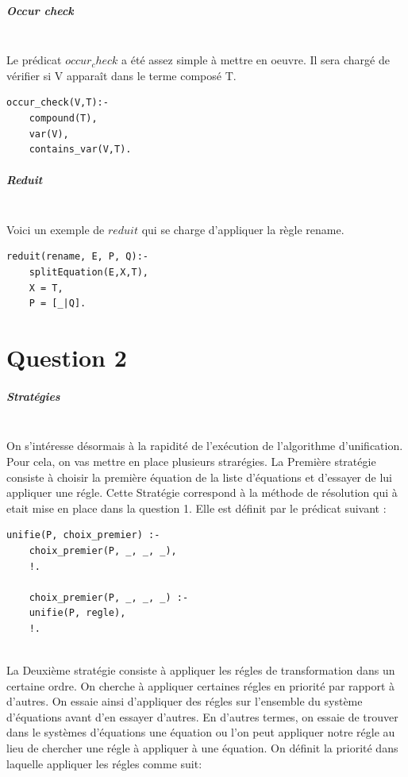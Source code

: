\documentclass[10pt,a4paper]{report}
\begin{document}
\paragraph{Occur check} ~\\
Le prédicat $occur_check$ a été assez simple à mettre en oeuvre. Il sera chargé de vérifier si V apparaît dans le terme composé T.
\begin{lstlisting}[caption ={occur\_check dans $main.pl$}]
occur_check(V,T):-
	compound(T),
	var(V),
	contains_var(V,T).
\end{lstlisting}

\paragraph{Reduit} ~\\
Voici un exemple de $reduit$ qui se charge d'appliquer la règle rename.
\begin{lstlisting}[caption ={reduit dans $main.pl$}]
reduit(rename, E, P, Q):-
	splitEquation(E,X,T),
	X = T,
	P = [_|Q].
\end{lstlisting}





\chapter*{Question 2}
\paragraph{Stratégies} ~\\
On s'intéresse désormais à la rapidité de l'exécution de l'algorithme d'unification.
Pour cela, on vas mettre en place plusieurs strarégies.
\newline
La Première stratégie consiste à choisir la première équation de la liste d'équations et d'essayer de lui appliquer une régle. Cette Stratégie correspond à la méthode de résolution qui à etait mise en place dans la question 1. Elle est définit par le prédicat suivant :
\begin{lstlisting}[caption ={Stratégie choix premier dans $main.pl$}]
% unification choix premier
unifie(P, choix_premier) :- 
	choix_premier(P, _, _, _),
	!.
	
	choix_premier(P, _, _, _) :- 
	unifie(P, regle),
	!.
\end{lstlisting} ~\\

La Deuxième stratégie consiste à appliquer les régles de transformation dans un certaine ordre. On cherche à appliquer certaines régles en priorité par rapport à d'autres. On essaie ainsi d'appliquer des régles sur l'ensemble du système d'équations avant d'en essayer d'autres. En d'autres termes, on essaie de trouver dans le systèmes d'équations une équation ou l'on peut appliquer notre régle au lieu de chercher une régle à appliquer à une équation.
\newline
On définit la priorité dans laquelle appliquer les régles comme suit:
\end{document}
